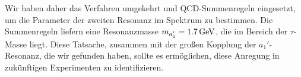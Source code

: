 Wir haben daher das Verfahren umgekehrt und QCD-Summenregeln eingesetzt,
um die Parameter der zweiten Resonanz im Spektrum zu bestimmen.
Die Summenregeln liefern eine Resonanzmasse $m_{a_1'}=1.7\,\rm GeV$,
die im Bereich der $\tau$-Masse liegt. Diese Tatsache, zusammen 
mit der gro\ss en Kopplung der $a_1'$-Resonanz, die wir gefunden haben,
sollte es erm\"oglichen, diese Anregung in zuk\"unftigen Experimenten 
zu identifizieren.
